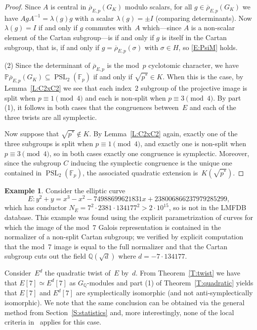 \documentclass[12pt, reqno]{amsart}
\newcommand{\Fp}{\mathbb{F}_p}
\newcommand{\PP}{\mathbb{P}}
\newcommand{\Q}{\mathbb{Q}}
\newcommand{\rhobar}{{\overline{\rho}}}
\newcommand{\PSL}{\operatorname{PSL}}
\numberwithin{equation}{section}
\theoremstyle{definition}
\newtheorem{example}[theorem]{Example}
\theoremstyle{remark}
\begin{document}
\begin{proof}
Since $A$ is central in $\rhobar_{E,p}(G_K)$ modulo scalars, for all
$g\in\rhobar_{E,p}(G_K)$ we have $AgA^{-1}=\lambda(g)g$ with a scalar
$\lambda(g)=\pm I$ (comparing determinants).  Now $\lambda(g)=I$ if and
only if $g$ commutes with~$A$ which---since $A$ is a non-scalar element
of the Cartan subgroup---is if and only if $g$ is itself in the Cartan
subgroup, that is, if and only if $g=\rhobar_{E,p}(\sigma)$ with
$\sigma\in H$, so  \eqref{E:PsiM} holds.


(2) Since the determinant of $\rhobar_{E,p}$ is the mod~$p$ cyclotomic
character, we have $\PP\rhobar_{E,p}(G_K)\subseteq \PSL_2(\Fp)$ if
and only if $\sqrt{p^*}\in K$.  When this is the case, by
Lemma~\ref{L:C2xC2} we see that each index~$2$ subgroup of the
projective image is split when $p\equiv1\pmod4$ and each is non-split
when $p\equiv3\pmod4$.  By part (1), it follows in both cases that the
congruences between~$E$ and each of the three twists are all
symplectic.

Now suppose that $\sqrt{p^*}\notin K$.  By Lemma~\ref{L:C2xC2} again,
exactly one of the three subgroups is split when $p\equiv1\pmod4$, and
exactly one is non-split when $p\equiv3\pmod4$, so in both cases
exactly one congruence is symplectic.  Moreover, since the subgroup
$C$ inducing the symplectic congruence is the unique one contained in
$\PSL_2(\Fp)$, the associated quadratic extension is~$K(\sqrt{p^*})$.
\end{proof}

\begin{example} 
\label{Ex:LocalFail7}
Consider the elliptic curve
\[ E : y^2 + y = x^3 - x^2 - 74988699621831x +  238006866237979285299, \]
which has conductor $ N_E = 7^2 \cdot 2381 \cdot
134177^2>2\cdot10^{15}$, so is not in the LMFDB database.  This
example was found using the explicit parametrization of curves for
which the image of the mod~$7$ Galois representation is contained in
the normalizer of a non-split Cartan subgroup; we verified by explicit
computation that the mod~7 image is equal to the full normalizer and that the Cartan subgroup cuts out the field $\Q(\sqrt{d})$ where $d = -7 \cdot 134177$. 

Consider~$E^d$ the quadratic twist
of~$E$ by~$d$. 
From Theorem~\ref{T:twist} we have that $E[7] \simeq E^d[7]$ as $G_\Q$-modules and part (1) of Theorem~\ref{T:quadratic} yields that $E[7]$ and $E^d[7]$ are
symplectically isomorphic (and not anti-symplectically
isomorphic). We note that the same conclusion can be obtained via the general method from Section~\ref{S:statistics} 
and, more interestingly, none of the local criteria
in~\cite{FKSym} applies for this case.
\end{example}
\end{document}
